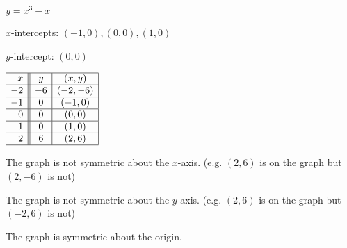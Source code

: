 {$y = x^{3} - x$}
{$x$-intercepts: $(-1, 0), (0, 0), (1, 0)$ \smallskip

$y$-intercept: $(0, 0)$ \smallskip

$\begin{array}{|r||c|c|}  

\hline
 x &  y & (x,y) \\ \hline
-2 & -6 & (-2, -6) \\  \hline
-1 &  0 & (-1, 0) \\ \hline
 0 &  0 & (0, 0) \\ \hline
 1 &  0 & (1, 0) \\ \hline
 2 &  6 & (2, 6) \\ \hline
 
\end{array} $ \smallskip


\smallskip

The graph is not symmetric about the $x$-axis. (e.g. $(2, 6)$ is on the graph but $(2, -6)$ is not) \smallskip

The graph is not symmetric about the $y$-axis. (e.g. $(2, 6)$ is on the graph but $(-2, 6)$ is not) \smallskip

The graph is symmetric about the origin.}